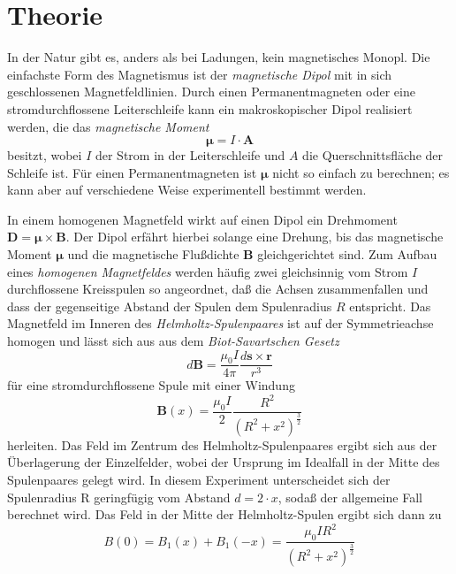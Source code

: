 \section{Theorie}
\label{sec:Theorie}
In der Natur gibt es, anders als bei Ladungen, kein magnetisches Monopl.
Die einfachste Form des Magnetismus ist der \textit{magnetische Dipol} mit in sich geschlossenen Magnetfeldlinien.
Durch einen Permanentmagneten oder eine stromdurchflossene Leiterschleife kann ein makroskopischer Dipol realisiert werden,
die das \textit{magnetische Moment}
\begin{equation}
    \symbf{\mu} = I \cdot \symbf{A}
\end{equation}
besitzt, wobei $I$ der Strom in der Leiterschleife und $A$ die Querschnittsfläche der Schleife ist.
Für einen Permanentmagneten ist $\symbf{\mu}$ nicht so einfach zu berechnen; es kann aber auf verschiedene Weise experimentell bestimmt werden.

In einem homogenen Magnetfeld wirkt auf einen Dipol ein Drehmoment $\symbf{D} = \symbf{\mu} \times \symbf{B} $. Der Dipol erfährt hierbei solange eine Drehung, bis das magnetische Moment $\symbf{\mu}$ und die magnetische Flußdichte $\symbf{B}$ gleichgerichtet sind.
Zum Aufbau eines \textit{homogenen Magnetfeldes} werden häuﬁg zwei gleichsinnig vom Strom $I$ durchﬂossene Kreisspulen so angeordnet, daß die Achsen zusammenfallen und dass der gegenseitige Abstand der Spulen dem Spulenradius $R$ entspricht.
Das Magnetfeld im Inneren des \textit{Helmholtz-Spulenpaares} ist auf der Symmetrieachse homogen und lässt sich aus aus dem \textit{Biot-Savartschen Gesetz}
\begin{equation}
    d\symbf{B} = \frac{\mu_0 I}{4 \pi} \frac{d\symbf{s} \times \symbf{r}}{r^3}
\end{equation}
für eine stromdurchflossene Spule mit einer Windung
\begin{equation}
    \symbf{B}(x) = \frac{\mu_0 I}{2} \frac{R^2}{(R^2 + x^2)^{\frac{3}{2}}}
\end{equation}
herleiten. Das Feld im Zentrum des Helmholtz-Spulenpaares ergibt sich aus der Überlagerung der Einzelfelder, wobei der Ursprung im Idealfall in der Mitte des Spulenpaares gelegt wird.
In diesem Experiment unterscheidet sich der Spulenradius R geringfügig vom Abstand $d = 2·x$, sodaß der allgemeine Fall berechnet wird. Das Feld in der Mitte der Helmholtz-Spulen ergibt sich dann zu
\begin{equation}
    B(0) = B_1 (x) + B_1 (-x) = \frac{\mu_0 I R^2}{(R^2 + x^2)^{\frac{3}{2}}}
    \label{eqn:bfeld}
\end{equation}



